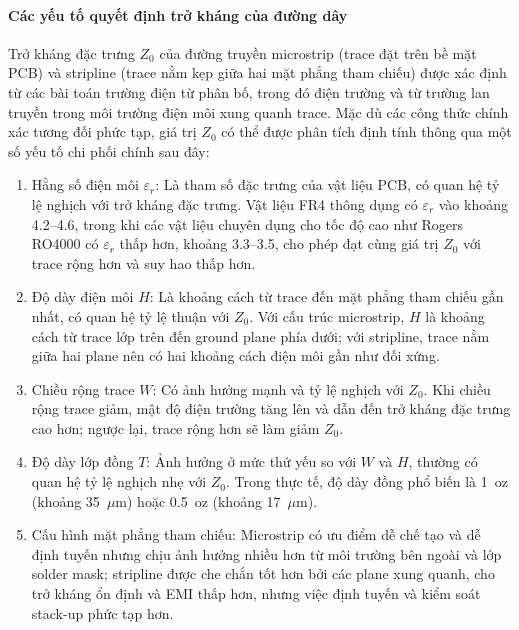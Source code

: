                     \paragraph{Các yếu tố quyết định trở kháng của đường dây}
                        Trở kháng đặc trưng \(Z_0\) của đường truyền microstrip (trace đặt trên bề mặt PCB) và stripline (trace nằm kẹp giữa hai mặt phẳng tham chiếu) được xác định từ các bài toán trường điện từ phân bố, trong đó điện trường và từ trường lan truyền trong môi trường điện môi xung quanh trace. Mặc dù các công thức chính xác tương đối phức tạp, giá trị \(Z_0\) có thể được phân tích định tính thông qua một số yếu tố chi phối chính sau đây:

                        \begin{enumerate}
                            \item Hằng số điện môi \(\varepsilon_r\): Là tham số đặc trưng của vật liệu PCB, có quan hệ tỷ lệ nghịch với trở kháng đặc trưng. Vật liệu FR4 thông dụng có \(\varepsilon_r\) vào khoảng 4.2–4.6, trong khi các vật liệu chuyên dụng cho tốc độ cao như Rogers RO4000 có \(\varepsilon_r\) thấp hơn, khoảng 3.3–3.5, cho phép đạt cùng giá trị \(Z_0\) với trace rộng hơn và suy hao thấp hơn.
                            \item Độ dày điện môi \(H\): Là khoảng cách từ trace đến mặt phẳng tham chiếu gần nhất, có quan hệ tỷ lệ thuận với \(Z_0\). Với cấu trúc microstrip, \(H\) là khoảng cách từ trace lớp trên đến ground plane phía dưới; với stripline, trace nằm giữa hai plane nên có hai khoảng cách điện môi gần như đối xứng.
                            \item Chiều rộng trace \(W\): Có ảnh hưởng mạnh và tỷ lệ nghịch với \(Z_0\). Khi chiều rộng trace giảm, mật độ điện trường tăng lên và dẫn đến trở kháng đặc trưng cao hơn; ngược lại, trace rộng hơn sẽ làm giảm \(Z_0\).
                            \item Độ dày lớp đồng \(T\): Ảnh hưởng ở mức thứ yếu so với \(W\) và \(H\), thường có quan hệ tỷ lệ nghịch nhẹ với \(Z_0\). Trong thực tế, độ dày đồng phổ biến là 1~oz (khoảng 35~\(\mu\)m) hoặc 0.5~oz (khoảng 17~\(\mu\)m).
                            \item Cấu hình mặt phẳng tham chiếu: Microstrip có ưu điểm dễ chế tạo và dễ định tuyến nhưng chịu ảnh hưởng nhiều hơn từ môi trường bên ngoài và lớp solder mask; stripline được che chắn tốt hơn bởi các plane xung quanh, cho trở kháng ổn định và EMI thấp hơn, nhưng việc định tuyến và kiểm soát stack-up phức tạp hơn.

\end{enumerate}
